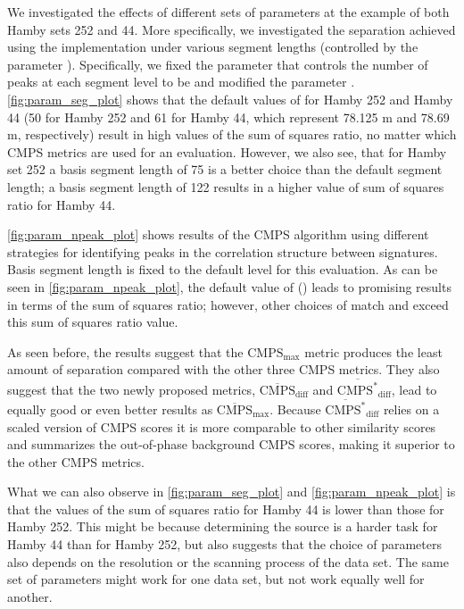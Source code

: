 We investigated the effects of different sets of parameters at the
example of both Hamby sets 252 and 44. More specifically, we
investigated the separation achieved using the 
implementation under various segment lengths (controlled by the
parameter ). Specifically, we fixed the parameter
 that controls the number of peaks at each segment
level to be  and modified the parameter
. \autoref{fig:param_seg_plot} shows that the default
values of  for Hamby 252 and Hamby 44 (50 for Hamby
252 and 61 for Hamby 44, which represent 78.125 \textmu m and 78.69
\textmu m, respectively) result in high values of the sum of squares
ratio, no matter which CMPS metrics are used for an evaluation. However,
we also see, that for Hamby set 252 a basis segment length of 75 is a
better choice than the default segment length; a basis segment length of
122 results in a higher value of sum of squares ratio for Hamby 44.

\autoref{fig:param_npeak_plot} shows results of the CMPS algorithm using
different strategies for identifying peaks in the correlation structure
between signatures. Basis segment length is fixed to the default level
for this evaluation. As can be seen in \autoref{fig:param_npeak_plot},
the default value of  ()
leads to promising results in terms of the sum of squares ratio;
however, other choices of  match and exceed this sum of
squares ratio value.

As seen before, the results suggest that the \(\mathrm{CMPS_{max}}\)
metric produces the least amount of separation compared with the other
three CMPS metrics. They also suggest that the two newly proposed
metrics, \(\mathrm{\overline{CMPS}_{diff}}\) and
\(\mathrm{\overline{CMPS^*}_{diff}}\), lead to equally good or even
better results as \(\mathrm{\overline{CMPS}_{max}}\). Because
\(\mathrm{\overline{CMPS^*}_{diff}}\) relies on a scaled version of CMPS
scores it is more comparable to other similarity scores and summarizes
the out-of-phase background CMPS scores, making it superior to the other
CMPS metrics.

What we can also observe in \autoref{fig:param_seg_plot} and
\autoref{fig:param_npeak_plot} is that the values of the sum of squares
ratio for Hamby 44 is lower than those for Hamby 252. This might be
because determining the source is a harder task for Hamby 44 than for
Hamby 252, but also suggests that the choice of parameters also depends
on the resolution or the scanning process of the data set. The same set
of parameters might work for one data set, but not work equally well for
another.

